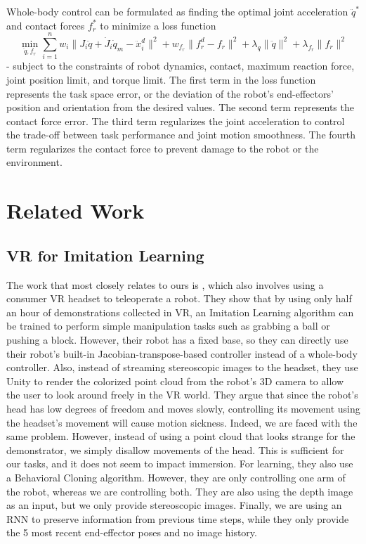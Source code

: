 Whole-body control can be formulated as finding the optimal joint acceleration $\ddot{q}^*$ and contact forces $f_r^*$ to minimize a loss function 
$$
\min_{\ddot{q}, f_r}
 \sum_{i=1}^{n} 
  w_i \|J_i\ddot{q} 
   +\dot{J}_i\dot{q}_m
   -\ddot{x}_i^d\|^2
  +w_{f_r} \| f_r^d - f_r\|^2
  +\lambda_q \|\ddot{q}\|^2
  +\lambda_{f_r} \|f_r\|^2
$$
- subject to the constraints of robot dynamics, contact, maximum reaction force, joint position limit, and torque limit.
The first term in the loss function represents the task space error, or the deviation of the robot's end-effectors' position and orientation from the desired values. The second term represents the contact force error. The third term regularizes the joint acceleration to control the trade-off between task performance and joint motion smoothness. The fourth term regularizes the contact force to prevent damage to the robot or the environment.

\section{Related Work}

\subsection{VR for Imitation Learning}

The work that most closely relates to ours is \cite{zhang2018deep}, which also involves using a consumer VR headset to teleoperate a robot. They show that by using only half an hour of demonstrations collected in VR, an Imitation Learning algorithm can be trained to perform simple manipulation tasks such as grabbing a ball or pushing a block. 
However, their robot has a fixed base, so they can directly use their robot's built-in Jacobian-transpose-based controller instead of a whole-body controller. 
Also, instead of streaming stereoscopic images to the headset, they use Unity to render the colorized point cloud from the robot's 3D camera to allow the user to look around freely in the VR world. 
They argue that since the robot's head has low degrees of freedom and moves slowly, controlling its movement using the headset's movement will cause motion sickness. 
Indeed, we are faced with the same problem. 
However, instead of using a point cloud that looks strange for the demonstrator, we simply disallow movements of the head.
This is sufficient for our tasks, and it does not seem to impact immersion. 
For learning, they also use a Behavioral Cloning algorithm. 
However, they are only controlling one arm of the robot, whereas we are controlling both. 
They are also using the depth image as an input, but we only provide stereoscopic images. 
Finally, we are using an RNN to preserve information from previous time steps, while they only provide the 5 most recent end-effector poses and no image history. 

